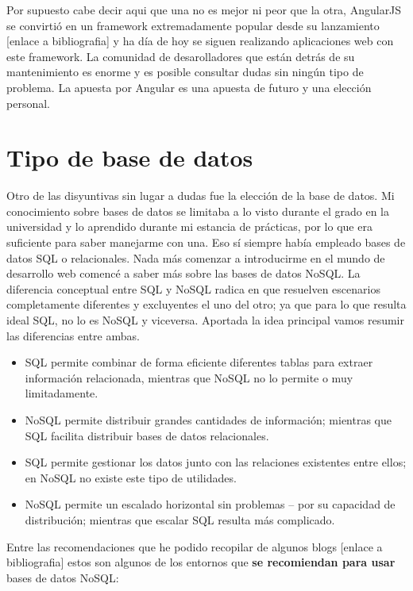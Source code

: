 Por supuesto cabe decir aqui que una no es mejor ni peor que la otra, AngularJS se convirtió en un framework extremadamente popular desde su lanzamiento [enlace a bibliografia] y ha día de hoy se siguen realizando aplicaciones web con este framework. La comunidad de desarolladores que están detrás de su mantenimiento es enorme y es posible consultar dudas sin ningún tipo de problema. La apuesta por Angular es una apuesta de futuro y una elección personal.


  \section{Tipo de base de datos}\label{base de datos}
  
  Otro de las disyuntivas sin lugar a dudas fue la elección de la base de datos. Mi conocimiento sobre bases de datos se limitaba a lo visto durante el grado en la universidad y lo aprendido durante mi estancia de prácticas, por lo que era suficiente para saber manejarme con una. Eso sí siempre había empleado bases de datos SQL o relacionales. Nada más comenzar a introducirme en el mundo de desarrollo web comencé a saber más sobre las bases de datos NoSQL. La diferencia conceptual entre SQL y NoSQL radica en que resuelven escenarios completamente diferentes y excluyentes el uno del otro; ya que para lo que resulta ideal SQL, no lo es NoSQL y viceversa. Aportada la idea principal vamos resumir las diferencias entre ambas. 
  
  \begin{itemize}
    \item SQL permite combinar de forma eficiente diferentes tablas para extraer información relacionada, mientras que NoSQL no lo permite o muy limitadamente.
    \item NoSQL permite distribuir grandes cantidades de información; mientras que SQL facilita distribuir bases de datos relacionales.
    \item SQL permite gestionar los datos junto con las relaciones existentes entre ellos; en NoSQL no existe este tipo de utilidades.
    \item NoSQL permite un escalado horizontal sin problemas – por su capacidad de distribución; mientras que escalar SQL resulta más complicado.
   \end{itemize}
   
    Entre las recomendaciones que he podido recopilar de algunos blogs [enlace a bibliografia] estos son algunos de los entornos que \textbf{se recomiendan para usar} bases de datos NoSQL:
    
